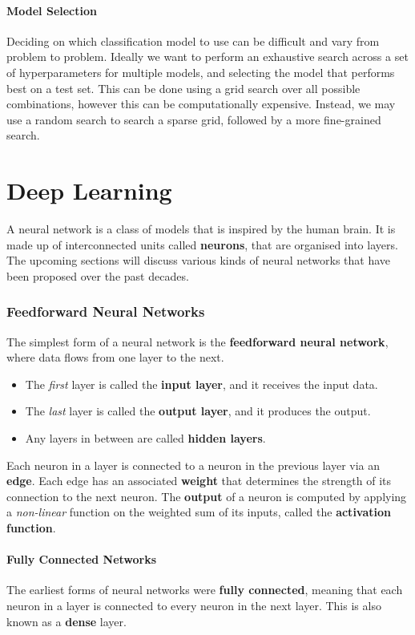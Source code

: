 \documentclass{article}
\begin{document}
\subsection{Model Selection}
Deciding on which classification model to use can be difficult and vary
from problem to problem. Ideally we want to perform an exhaustive
search across a set of hyperparameters for multiple models, and
selecting the model that performs best on a test set. This can be done
using a grid search over all possible combinations, however this can be
computationally expensive. Instead, we may use a random search to
search a sparse grid, followed by a more fine-grained search.
\part{Deep Learning}
A neural network is a class of models that is inspired by the human
brain. It is made up of interconnected units called \textbf{neurons},
that are organised into layers. The upcoming sections will discuss
various kinds of neural networks that have been proposed over the past
decades.
\section{Feedforward Neural Networks}
The simplest form of a neural network is the \textbf{feedforward neural
network}, where data flows from one layer to the next.
\begin{itemize}
    \item The \textit{first} layer is called the \textbf{input layer},
          and it receives the input data.
    \item The \textit{last} layer is called the \textbf{output layer},
          and it produces the output.
    \item Any layers in between are called \textbf{hidden layers}.
\end{itemize}
Each neuron in a layer is connected to a neuron in the previous layer
via an \textbf{edge}. Each edge has an associated \textbf{weight} that
determines the strength of its connection to the next neuron. The
\textbf{output} of a neuron is computed by applying a \textit{non-linear}
function on the weighted sum of its inputs, called the \textbf{activation function}.
\subsection{Fully Connected Networks}
The earliest forms of neural networks were \textbf{fully connected},
meaning that each neuron in a layer is connected to every neuron in the
next layer. This is also known as a \textbf{dense} layer.
\end{document}
